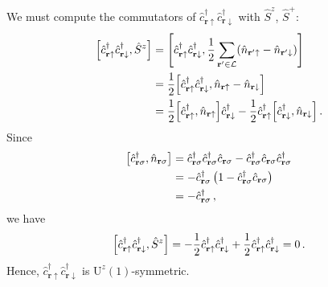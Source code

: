 \begin{tabproof}

	We must compute the commutators of $\hat c_{\mathbf{r}\uparrow}^\dagger \hat c_{\mathbf{r}\downarrow}^\dagger$ with $\hat S^z$, $\hat S^+$:
	\[
	\begin{aligned}
		\comm{\hat c_{\mathbf{r}\uparrow}^\dagger \hat c_{\mathbf{r}\downarrow}^\dagger}{\hat S^z} &= \comm{\hat c_{\mathbf{r}\uparrow}^\dagger \hat c_{\mathbf{r}\downarrow}^\dagger}{\frac{1}{2} \sum_{\mathbf{r}'\in\mathcal{L}} (\hat n_{\mathbf{r}'\uparrow}-\hat n_{\mathbf{r}'\downarrow})} \\
		&= \frac{1}{2} \comm{\hat c_{\mathbf{r}\uparrow}^\dagger \hat c_{\mathbf{r}\downarrow}^\dagger}{\hat n_{\mathbf{r}\uparrow}-\hat n_{\mathbf{r}\downarrow}} \\
		&= \frac{1}{2} \comm{\hat c_{\mathbf{r}\uparrow}^\dagger}{\hat n_{\mathbf{r}\uparrow}} \hat c_{\mathbf{r}\downarrow}^\dagger - \frac{1}{2} \hat c_{\mathbf{r}\uparrow}^\dagger \comm{\hat c_{\mathbf{r}\downarrow}^\dagger}{\hat n_{\mathbf{r}\downarrow}} \, .
	\end{aligned}
	\]
	Since
	\begin{align}
		\comm{\hat c_{\mathbf{r}\sigma}^\dagger}{\hat n_{\mathbf{r}\sigma}} &= \hat c_{\mathbf{r}\sigma}^\dagger \hat c_{\mathbf{r}\sigma}^\dagger \hat c_{\mathbf{r}\sigma} - \hat c_{\mathbf{r}\sigma}^\dagger \hat c_{\mathbf{r}\sigma} \hat c_{\mathbf{r}\sigma}^\dagger \nonumber \\
		&= -\hat c_{\mathbf{r}\sigma}^\dagger \left(
		1 - \hat c_{\mathbf{r}\sigma}^\dagger \hat c_{\mathbf{r}\sigma} \right) \nonumber \\
		&= -\hat c_{\mathbf{r}\sigma}^\dagger \label{eq:[c+,n]} \, ,
	\end{align}
	we have
	\[
		\comm{\hat c_{\mathbf{r}\uparrow}^\dagger \hat c_{\mathbf{r}\downarrow}^\dagger}{\hat S^z} = -\frac{1}{2} \hat c_{\mathbf{r}\uparrow}^\dagger \hat c_{\mathbf{r}\downarrow}^\dagger + \frac{1}{2} \hat c_{\mathbf{r}\uparrow}^\dagger \hat c_{\mathbf{r}\downarrow}^\dagger = 0 \, .
	\]
	Hence, $\hat c_{\mathbf{r}\uparrow}^\dagger \hat c_{\mathbf{r}\downarrow}^\dagger$ is $\mathrm{U}^z(1)$-symmetric.
	

\end{tabproof}
